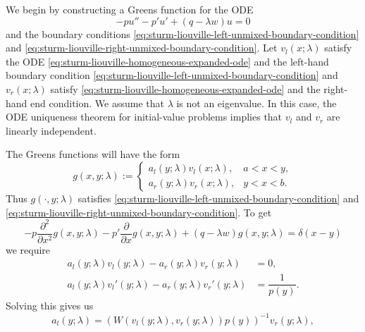 \begin{Proof}
We begin by constructing a Green\textquotesingle s function for the ODE
\begin{equation}\label{eq:sturm-liouville-homogeneous-expanded-ode}
-pu''-p'u'+(q-\lambda w)u=0
\end{equation}
and the boundary conditions \eqref{eq:sturm-liouville-left-unmixed-boundary-condition} and \eqref{eq:sturm-liouville-right-unmixed-boundary-condition}. Let $v_l(x;\lambda)$ satisfy the ODE \eqref{eq:sturm-liouville-homogeneous-expanded-ode} and the left-hand boundary condition \eqref{eq:sturm-liouville-left-unmixed-boundary-condition} and $v_r(x;\lambda)$ satisfy \eqref{eq:sturm-liouville-homogeneous-expanded-ode} and the right-hand end condition. We assume that $\lambda$ is not an eigenvalue. In this case, the ODE uniqueness theorem for initial-value problems implies that $v_l$ and $v_r$ are linearly independent.

The Green\textquotesingle s functions will have the form
\begin{equation}\label{eq:sturm-liouville-green-function-piecewise-ansatz}
g(x,y;\lambda):=\begin{cases}
a_l(y;\lambda)v_l(x;\lambda),&a<x<y,\\
a_r(y;\lambda)v_r(x;\lambda),&y<x<b.
\end{cases}
\end{equation}
Thus $g(\cdot,y;\lambda)$ satisfies \eqref{eq:sturm-liouville-left-unmixed-boundary-condition} and \eqref{eq:sturm-liouville-right-unmixed-boundary-condition}. To get
\begin{equation}\label{eq:sturm-liouville-green-function-delta-equation}
-p\frac{\partial^2}{\partial x^2}g(x,y;\lambda)-p'\frac{\partial}{\partial x}g(x,y;\lambda)+(q-\lambda w)g(x,y;\lambda)=\delta(x-y)
\end{equation}
we require\[\begin{aligned}
a_l(y;\lambda)v_l(y;\lambda)-a_r(y;\lambda)v_r(y;\lambda)&=0,\\
a_l(y;\lambda)v_l'(y;\lambda)-a_r(y;\lambda)v_r'(y;\lambda)&=\dfrac{1}{p(y)}.
\end{aligned}\]Solving this gives us
\begin{equation}\label{eq:sturm-liouville-green-left-coefficient}
a_l(y;\lambda)=(W(v_l(y;\lambda),v_r(y;\lambda))p(y))^{-1}v_r(y;\lambda),
\end{equation}


\end{Proof}
